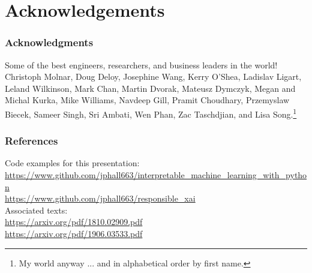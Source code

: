 \documentclass[11pt,aspectratio=169,hyperref={colorlinks}]{beamer}
\begin{document}
		
\section{Acknowledgements} 

	\begin{frame}
	
		\frametitle{Acknowledgments}
		
		Some of the best engineers, researchers, and business leaders in the world!\\
		\vspace{10pt}
		Christoph Molnar, Doug Deloy, Josephine Wang, Kerry O'Shea, Ladislav Ligart, Leland Wilkinson, Mark Chan, Martin Dvorak, Mateusz Dymczyk, Megan and Michal Kurka, Mike Williams, Navdeep Gill, Pramit Choudhary, Przemyslaw Biecek, Sameer Singh, Sri Ambati, Wen Phan, Zac Taschdjian, and Lisa Song.\footnote{\tiny{My world anyway ... and in alphabetical order by first name.}}

	\end{frame}	
			


	\begin{frame}[t, allowframebreaks]
	
		\frametitle{References}	
		
			\normalsize Code examples for this presentation:\\
			\scriptsize{\url{https://www.github.com/jphall663/interpretable_machine_learning_with_python}}\\
			\noindent\scriptsize{\url{https://www.github.com/jphall663/responsible_xai}}\\
			\vspace{10pt}
			\normalsize Associated texts:\\
			\scriptsize{\url{https://arxiv.org/pdf/1810.02909.pdf}}\\
			\noindent\scriptsize{\url{https://arxiv.org/pdf/1906.03533.pdf}}
								
		\framebreak		
		
		\tiny
		\printbibliography
		
	\end{frame}
\end{document}
